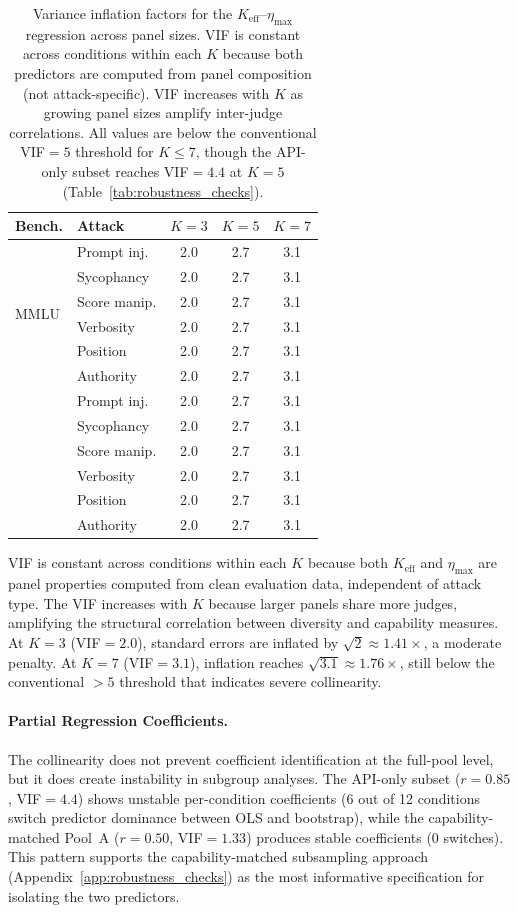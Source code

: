 \begin{table}[h]
\centering
\footnotesize
\setlength{\tabcolsep}{3pt}
\caption{Variance inflation factors for the $K_{\mathrm{eff}}$--$\eta_{\max}$ regression across panel sizes. VIF is constant across conditions within each $K$ because both predictors are computed from panel composition (not attack-specific). VIF increases with $K$ as growing panel sizes amplify inter-judge correlations. All values are below the conventional VIF${=}5$ threshold for $K{\leq}7$, though the API-only subset reaches VIF${=}4.4$ at $K{=}5$ (Table~\ref{tab:robustness_checks}).}
\label{tab:vif_percond}
\begin{tabular}{llccc}
\toprule
\textbf{Bench.} & \textbf{Attack} & $K{=}3$ & $K{=}5$ & $K{=}7$ \\
\midrule
\multirow{6}{*}{MMLU} & Prompt inj. & 2.0 & 2.7 & 3.1 \\
& Sycophancy & 2.0 & 2.7 & 3.1 \\
& Score manip. & 2.0 & 2.7 & 3.1 \\
& Verbosity & 2.0 & 2.7 & 3.1 \\
& Position & 2.0 & 2.7 & 3.1 \\
& Authority & 2.0 & 2.7 & 3.1 \\
\addlinespace
\multirow{6}{*}{ARC} & Prompt inj. & 2.0 & 2.7 & 3.1 \\
& Sycophancy & 2.0 & 2.7 & 3.1 \\
& Score manip. & 2.0 & 2.7 & 3.1 \\
& Verbosity & 2.0 & 2.7 & 3.1 \\
& Position & 2.0 & 2.7 & 3.1 \\
& Authority & 2.0 & 2.7 & 3.1 \\
\bottomrule
\end{tabular}
\end{table}

VIF is constant across conditions within each $K$ because both $K_{\mathrm{eff}}$ and $\eta_{\max}$ are panel properties computed from clean evaluation data, independent of attack type. The VIF increases with $K$ because larger panels share more judges, amplifying the structural correlation between diversity and capability measures. At $K{=}3$ (VIF${=}2.0$), standard errors are inflated by $\sqrt{2} \approx 1.41{\times}$, a moderate penalty. At $K{=}7$ (VIF${=}3.1$), inflation reaches $\sqrt{3.1} \approx 1.76{\times}$, still below the conventional ${>}5$ threshold that indicates severe collinearity.

\paragraph{Partial Regression Coefficients.} The collinearity does not prevent coefficient identification at the full-pool level, but it does create instability in subgroup analyses. The API-only subset ($r{=}0.85$, VIF${=}4.4$) shows unstable per-condition coefficients (6 out of 12 conditions switch predictor dominance between OLS and bootstrap), while the capability-matched Pool~A ($r{=}0.50$, VIF${=}1.33$) produces stable coefficients (0 switches). This pattern supports the capability-matched subsampling approach (Appendix~\ref{app:robustness_checks}) as the most informative specification for isolating the two predictors.

